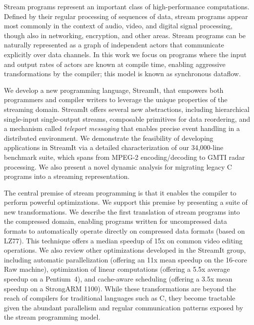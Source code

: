 Stream programs represent an important class of high-performance
computations.  Defined by their regular processing of sequences of
data, stream programs appear most commonly in the context of audio,
video, and digital signal processing, though also in networking,
encryption, and other areas.  Stream programs can be naturally
represented as a graph of independent actors that communicate
explicitly over data channels.  In this work we focus on programs
where the input and output rates of actors are known at compile time,
enabling aggressive transformations by the compiler; this model is
known as synchronous dataflow.

We develop a new programming language, StreamIt, that empowers both
programmers and compiler writers to leverage the unique properties of
the streaming domain.  StreamIt offers several new abstractions,
including hierarchical single-input single-output streams, composable
primitives for data reordering, and a mechanism called {\it teleport
messaging} that enables precise event handling in a distributed
environment.  We demonstrate the feasibility of developing
applications in StreamIt via a detailed characterization of our
34,000-line benchmark suite, which spans from MPEG-2 encoding/decoding
to GMTI radar processing.  We also present a novel dynamic analysis
for migrating legacy C programs into a streaming representation.

The central premise of stream programming is that it enables the
compiler to perform powerful optimizations.  We support this premise
by presenting a suite of new transformations.  We describe the first
translation of stream programs into the compressed domain, enabling
programs written for uncompressed data formats to automatically
operate directly on compressed data formats (based on LZ77).  This
technique offers a median speedup of 15x on common video editing
operations.  We also review other optimizations developed in the
StreamIt group, including automatic parallelization (offering an 11x
mean speedup on the 16-core Raw machine), optimization of linear
computations (offering a 5.5x average speedup on a Pentium~4), and
cache-aware scheduling (offering a 3.5x mean speedup on a StrongARM
1100).  While these transformations are beyond the reach of compilers
for traditional languages such as C, they become tractable given the
abundant parallelism and regular communication patterns exposed by the
stream programming model.
